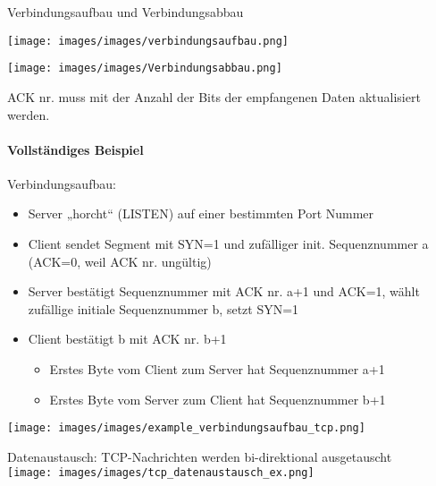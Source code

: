 \begin{KR}{Verbindungsaufbau und Verbindungsabbau}\\
\begin{minipage}{0.49\linewidth}
        \texttt{[image: images/images/verbindungsaufbau.png]}
\end{minipage}
\begin{minipage}{0.5\linewidth}
        \texttt{[image: images/images/Verbindungsabbau.png]}
\end{minipage}

ACK nr. muss mit der Anzahl der Bits der empfangenen Daten aktualisiert werden.
\end{KR}

\paragraph*{Vollständiges Beispiel}

\begin{example}
    Verbindungsaufbau:
    \begin{itemize}
        \item Server „horcht“ (LISTEN) auf einer bestimmten Port Nummer
        \item Client sendet Segment mit SYN=1 und zufälliger init. Sequenznummer a (ACK=0, weil ACK nr. ungültig)
        \item Server bestätigt Sequenznummer mit ACK nr. a+1 und ACK=1, wählt zufällige initiale Sequenznummer b, setzt SYN=1
        \item Client bestätigt b mit ACK nr. b+1 
        \begin{itemize}
            \item Erstes Byte vom Client zum Server hat Sequenznummer a+1
            \item Erstes Byte vom Server zum Client hat Sequenznummer b+1
        \end{itemize}
    \end{itemize}
        \texttt{[image: images/images/example\_verbindungsaufbau\_tcp.png]}
\end{example}

\begin{example}
    Datenaustausch: TCP-Nachrichten werden bi-direktional ausgetauscht\\
        \texttt{[image: images/images/tcp\_datenaustausch\_ex.png]}
\end{example}

